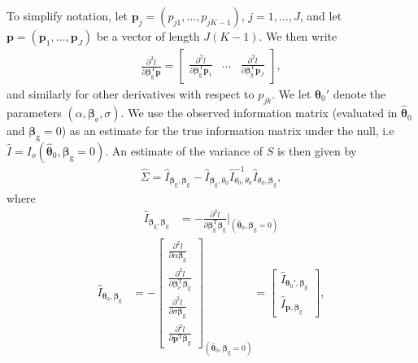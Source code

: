 \documentclass[10pt,a4paper]{article}
\def\bbetag{\bm{\beta}_{\text{g}}}
\def\bbetae{\bm{\beta}_{\text{e}}}
\begin{document}
To simplify notation, let $\mathbf{p}_j = (p_{j1}, \ldots, p_{jK-1})$, $j=1,\ldots,J$, and let $\mathbf{p} = (\mathbf{p}_1, \ldots, \mathbf{p}_J)$ be a vector of length $J(K-1)$. We then write
\begin{align*}
\frac{\partial^2 l}{\partial \bbetag^{\text{T}} \mathbf{p}} = 
\begin{bmatrix}
\frac{\partial^2 l}{\partial \bbetag^{\text{T}} \mathbf{p}_1} & \ldots & \frac{\partial^2 l}{\partial \bbetag^{\text{T}} \mathbf{p}_J}
\end{bmatrix},
\end{align*}
and similarly for other derivatives with respect to $p_{jk}$. We let $\boldsymbol\theta_0'$ denote the parameters $(\alpha, \bbetae, \sigma)$. We use the observed information matrix (evaluated in $\hat{\boldsymbol\theta}_0$ and $\bbetag = 0$) as an estimate for the true information matrix under the null, i.e $\hat{I} = I_o(\hat{\boldsymbol\theta}_0, \bbetag= 0)$.  An estimate of the variance of $S$ is then given by
\begin{align*}
\hat{\Sigma} = \hat{I}_{\bbetag, \bbetag} - \hat{I}_{\bbetag, \theta_0}\hat{I}_{\theta_0, \theta_0}^{-1} \hat{I}_{\theta_0,\bbetag},
\end{align*}
where
\begin{align*}
\hat{I}_{\bbetag, \bbetag} & = -\frac{\partial^2 l}{\partial \bbetag^{\text{T}} \bbetag}\bigg|_{(\hat{\boldsymbol\theta}_0, \bbetag= 0)}
\end{align*}
\begin{align*}
\hat{I}_{\boldsymbol\theta_0, \bbetag} &= - \begin{bmatrix}
 \frac{\partial^2 l}{\partial \alpha \bbetag} \\
\frac{\partial^2 l}{\partial \bbetae^{\text{T}} \bbetag } \\
\frac{\partial^2 l}{\partial \sigma \bbetag} \\
\frac{\partial^2 l}{\partial \mathbf{p}^{\text{T}} \bbetag}
\end{bmatrix}_{(\hat{\boldsymbol\theta}_0, \bbetag= 0)} = 
\begin{bmatrix}
\hat{I}_{\boldsymbol\theta_0',\bbetag} \\
\hat{I}_{\mathbf{p},\bbetag}
\end{bmatrix},
\end{align*}
\end{document}
